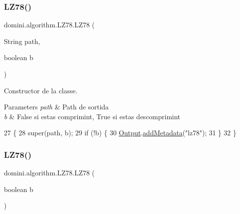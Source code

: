 \subsubsection{\texorpdfstring{L\+Z78()}{LZ78()}\hspace{0.1cm}{\footnotesize\ttfamily [1/2]}}
{\footnotesize\ttfamily domini.\+algorithm.\+L\+Z78.\+L\+Z78 (\begin{DoxyParamCaption}\item[{String}]{path,  }\item[{boolean}]{b }\end{DoxyParamCaption})\hspace{0.3cm}{\ttfamily [inline]}}



Constructor de la classe. 


\begin{DoxyParams}{Parameters}
{\em path} & Path de sortida \\
\hline
{\em b} & False si estas comprimint, True si estas descomprimint \\
\hline
\end{DoxyParams}

\begin{DoxyCode}
27                                         \{
28         super(path, b);
29         \textcolor{keywordflow}{if} (!b) \{
30             \hyperlink{classdomini_1_1algorithm_1_1Algorithm_a4de9955411c656325adc391ef570c082}{Output}.\hyperlink{classpersistencia_1_1output_1_1Ctrl__Output_ae6d6857910a023982900ddc857b891f0}{addMetadata}(\textcolor{stringliteral}{"lz78"});
31         \}
32     \}
\end{DoxyCode}
\mbox{\label{classdomini_1_1algorithm_1_1LZ78_abdeba774404b53d266e9fbe4aa35f757}} 
\subsubsection{\texorpdfstring{L\+Z78()}{LZ78()}\hspace{0.1cm}{\footnotesize\ttfamily [2/2]}}
{\footnotesize\ttfamily domini.\+algorithm.\+L\+Z78.\+L\+Z78 (\begin{DoxyParamCaption}\item[{boolean}]{b }\end{DoxyParamCaption})\hspace{0.3cm}{\ttfamily [inline]}}



